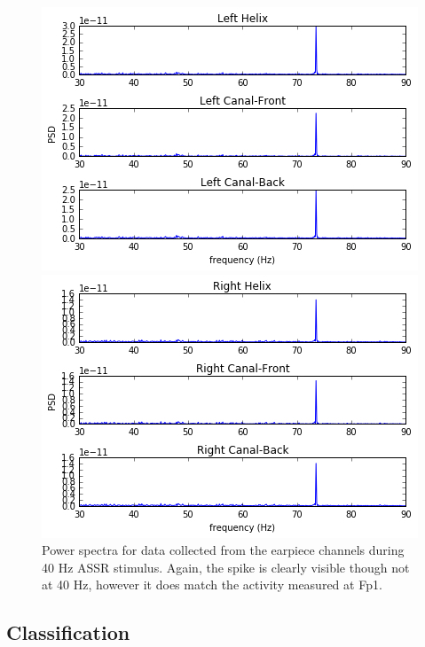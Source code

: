 \documentclass[letterpaper,twocolumn,10pt]{article}
\begin{document}
\begin{figure}[h]
  \centering
  \begin{minipage}[b]{0.45\textwidth}
    \includegraphics[width=\textwidth]{figures/001_ASSR_Left.jpg}
  \end{minipage}
  \hfill
  \begin{minipage}[b]{0.45\textwidth}
    \includegraphics[width=\textwidth]{figures/001_ASSR_Right.jpg}
  \end{minipage}
\caption{Power spectra for data collected from the earpiece channels during 40 Hz ASSR stimulus. Again, the spike is clearly visible though not at 40 Hz, however it 
does match the activity measured at Fp1.}
\end{figure}

\subsection{Classification}
\end{document}
